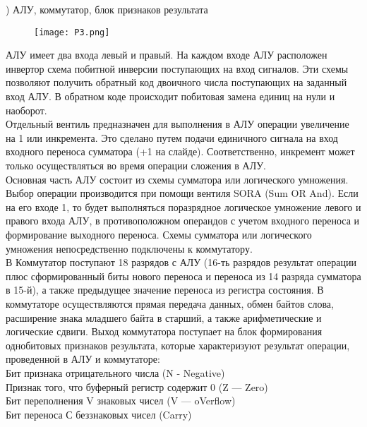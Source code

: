 ) АЛУ, коммутатор, блок признаков результата 
\begin{figure}[H]
    \centering
    \texttt{[image: P3.png]}
\end{figure}
\noindent АЛУ имеет два входа левый и правый. На каждом входе АЛУ расположен инвертор схема побитной инверсии поступающих на вход сигналов. Эти схемы позволяют получить обратный код двоичного числа поступающих на заданный вход АЛУ. В обратном коде происходит побитовая замена единиц на нули и наоборот. \\
Отдельный вентиль предназначен для выполнения в АЛУ операции увеличение на 1 или инкремента. Это сделано путем подачи единичного сигнала на вход входного переноса сумматора (+1 на слайде). Соответственно, инкремент может только осуществляться во время операции сложения в АЛУ. \\
Основная часть АЛУ состоит из схемы сумматора или логического умножения. Выбор операции производится при помощи вентиля SORA (Sum OR And). Если на его входе 1, то будет выполняться поразрядное логическое умножение левого и правого входа АЛУ, в противоположном операндов с учетом входного переноса и формирование выходного переноса. Схемы сумматора или логического умножения непосредственно подключены к коммутатору. \\
В Коммутатор поступают 18 разрядов с АЛУ (16-ть разрядов результат операции плюс сформированный биты нового переноса и переноса из 14 разряда сумматора в 15-й), а также предыдущее значение переноса из регистра состояния. В коммутаторе осуществляются прямая передача данных, обмен байтов слова, расширение знака младшего байта в старший, а также арифметические и логические сдвиги. Выход коммутатора поступает на блок формирования однобитовых признаков результата, которые характеризуют результат операции, проведенной в АЛУ и коммутаторе: \\
Бит признака отрицательного числа (N - Negative) \\
Признак того, что буферный регистр содержит 0 (Z — Zero) \\
Бит переполнения V знаковых чисел (V — oVerflow) \\
Бит переноса С беззнаковых чисел (Carry) \\

